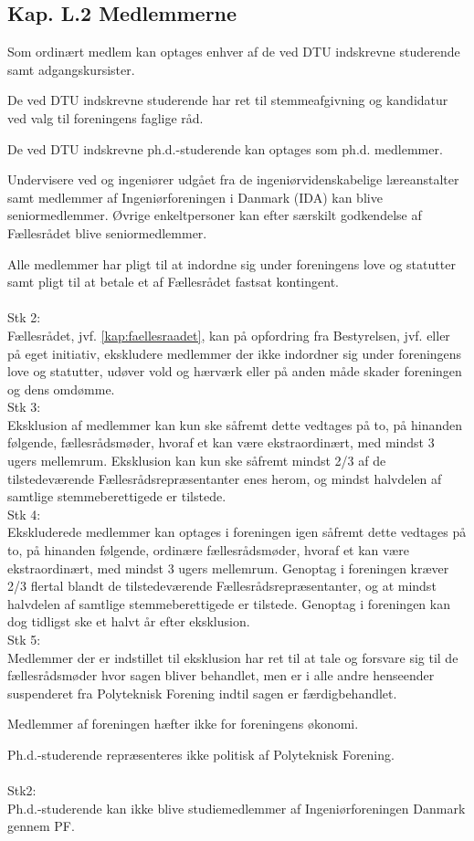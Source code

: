 \begin{list}
\subsection{Kap. L.2 Medlemmerne}
\label{kap:medlemmerne}
\item Som ordinært medlem kan optages enhver af de ved DTU indskrevne studerende samt adgangskursister.
\item De ved DTU indskrevne studerende har ret til stemmeafgivning og kandidatur ved valg til foreningens faglige råd.
\item De ved DTU indskrevne ph.d.-studerende kan optages som ph.d. medlemmer.
\item Undervisere ved og ingeniører udgået fra de ingeniørvidenskabelige læreanstalter samt medlemmer af         Ingeniørforeningen i Danmark (IDA) kan blive seniormedlemmer. Øvrige enkeltpersoner kan efter særskilt godkendelse af Fællesrådet blive seniormedlemmer.
\item Alle medlemmer har pligt til at indordne sig under foreningens love og statutter samt pligt til at betale et af Fællesrådet fastsat kontingent.\\
\\
Stk 2: \\
Fællesrådet, jvf. \ref{kap:faellesraadet}, kan på opfordring fra Bestyrelsen, jvf.  eller på eget initiativ,
ekskludere medlemmer der ikke indordner sig under foreningens love og statutter, udøver vold og hærværk
eller på anden måde skader foreningen og dens omdømme.
\\
Stk 3:\\
Eksklusion af medlemmer kan kun ske såfremt dette vedtages på to, på hinanden følgende,
fællesrådsmøder, hvoraf et kan være ekstraordinært, med mindst 3 ugers mellemrum. Eksklusion kan kun ske
såfremt mindst 2/3 af de tilstedeværende Fællesrådsrepræsentanter enes herom, og mindst halvdelen af
samtlige stemmeberettigede er tilstede.
\\
Stk 4: \\
Ekskluderede medlemmer kan optages i foreningen igen såfremt dette vedtages på to, på hinanden
følgende, ordinære fællesrådsmøder, hvoraf et kan være ekstraordinært, med mindst 3 ugers mellemrum.
Genoptag i foreningen kræver 2/3 flertal blandt de tilstedeværende Fællesrådsrepræsentanter, og at mindst
halvdelen af samtlige stemmeberettigede er tilstede. Genoptag i foreningen kan dog tidligst ske et halvt år
efter eksklusion.
\\
Stk 5: \\
Medlemmer der er indstillet til eksklusion har ret til at tale og forsvare sig til de fællesrådsmøder hvor
sagen bliver behandlet, men er i alle andre henseender suspenderet fra Polyteknisk Forening indtil sagen er
færdigbehandlet.
\item Medlemmer af foreningen hæfter ikke for foreningens økonomi.
\item Ph.d.-studerende repræsenteres ikke politisk af Polyteknisk Forening.\\
 \\
Stk2: \\
Ph.d.-studerende kan ikke blive studiemedlemmer af Ingeniørforeningen Danmark gennem PF.



\end{list}
